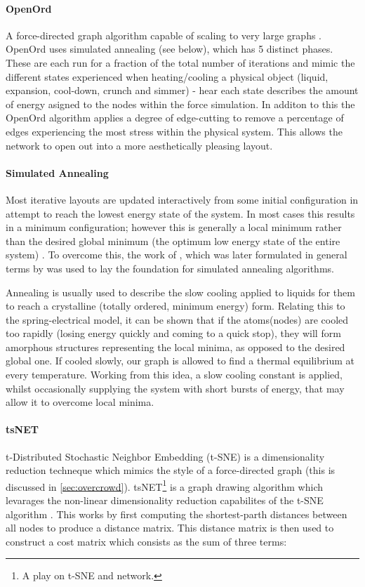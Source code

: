\paragraph{OpenOrd}
A force-directed graph algorithm capable of scaling to very large graphs \citep{openord}. OpenOrd uses simulated annealing (see below), which has 5 distinct phases. These are each run for a fraction of the total number of iterations and mimic the different states experienced when heating/cooling a physical object (liquid, expansion, cool-down, crunch and simmer) - hear each state describes the amount of energy asigned to the nodes within the force simulation. In additon to this the OpenOrd algorithm applies a degree of edge-cutting to remove a percentage of edges experiencing the most stress within the physical system. This allows the network to open out into a more aesthetically pleasing layout. 


\paragraph*{Simulated Annealing}
Most iterative layouts are updated interactively from some initial configuration in attempt to reach the lowest energy state of the system. In most cases this results in a minimum configuration; however this is generally a local minimum rather than the desired global minimum (the optimum low energy state of the entire system) \citep{nicelyanneal}. To overcome this, the work of \cite{metropolis}, which was later formulated in general terms by \citep{kirkpatrick} was used to lay the foundation for simulated annealing algorithms.

Annealing is usually used to describe the slow cooling applied to liquids for them to reach a crystalline (totally ordered, minimum energy) form. Relating this to the spring-electrical model, it can be shown that if the atoms(nodes) are cooled too rapidly (losing energy quickly and coming to a quick stop), they will form amorphous structures representing the local minima, as opposed to the desired global one.  If cooled slowly, our graph is allowed to find a thermal equilibrium at every temperature. Working from this idea, a slow cooling constant is applied, whilst occasionally supplying the system with short bursts of energy, that may allow it to overcome local minima. 


\paragraph{tsNET}
t-Distributed Stochastic Neighbor Embedding (t-SNE) is a dimensionality reduction techneque which mimics the style of a force-directed graph (this is discussed in \autoref{sec:overcrowd}). tsNET\footnote{A play on t-SNE and network.} is a graph drawing algorithm which levarages the non-linear dimensionality reduction capabilites of the t-SNE algorithm \citep{tsne}. This works by first computing the shortest-parth distances between all nodes to produce a distance matrix. This distance matrix is then used to construct a cost matrix which consists as the sum of three terms:

